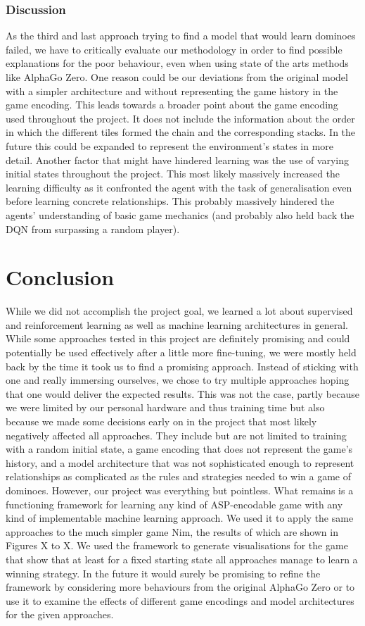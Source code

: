 \documentclass[12pt,a4paper]{article}
\begin{document}
{\subsubsection{Discussion}
As the third and last approach trying to find a model that would learn dominoes failed, we have to critically evaluate our methodology in order to find possible explanations for the poor behaviour, even when using state of the arts methods like AlphaGo Zero. One reason could be our deviations from the original model with a simpler architecture and without representing the game history in the game encoding. This leads towards a broader point about the game encoding used throughout the project. It does not include the information about the order in which the different tiles formed the chain and the corresponding stacks. In the future this could be expanded to represent the environment’s states in more detail.
Another factor that might have hindered learning was the use of varying initial states throughout the project. This most likely massively increased the learning difficulty as it confronted the agent with the task of generalisation even before learning concrete relationships. This probably massively hindered the agents' understanding of basic game mechanics (and probably also held back the DQN from surpassing a random player). 


\section{Conclusion}
While we did not accomplish the project goal, we learned a lot about supervised and reinforcement learning as well as machine learning architectures in general. While some approaches tested in this project are definitely promising and could potentially be used effectively after a little more fine-tuning, we were mostly held back by the time it took us to find a promising approach. Instead of sticking with one and really immersing ourselves, we chose to try multiple approaches hoping that one would deliver the expected results. This was not the case, partly because we were limited by our personal hardware and thus training time but also because we made some decisions early on in the project that most likely negatively affected all approaches. They include but are not limited to training with a random initial state, a game encoding that does not represent the game’s history, and a model architecture that was not sophisticated enough to represent relationships as complicated as the rules and strategies needed to win a game of dominoes.
However, our project was everything but pointless. What remains is a functioning framework for learning any kind of ASP-encodable game with any kind of implementable machine learning approach. We used it to apply the same approaches to the much simpler game Nim, the results of which are shown in Figures X to X. We used the framework to generate visualisations for the game that show that at least for a fixed starting state all approaches manage to learn a winning strategy. In the future it would surely be promising to refine the framework by considering more behaviours from the original AlphaGo Zero or to use it to examine the effects of different game encodings and model architectures for the given approaches.


}
\end{document}

